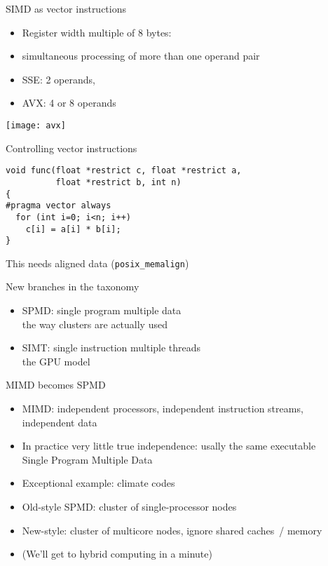 \begin{numberedframe}{SIMD as vector instructions}
  \begin{itemize}
  \item Register width multiple of 8 bytes:
  \item simultaneous processing of more than one operand pair
  \item SSE: 2 operands,
  \item AVX: 4 or 8 operands
  \end{itemize}
  \texttt{[image: avx]}
\end{numberedframe}

\begin{numberedframe}{Controlling vector instructions}
\begin{lstlisting}
void func(float *restrict c, float *restrict a,
          float *restrict b, int n)
{
#pragma vector always
  for (int i=0; i<n; i++)
    c[i] = a[i] * b[i];
}
\end{lstlisting}
This needs aligned data (\verb+posix_memalign+)
\end{numberedframe}

\begin{numberedframe}{New branches in the taxonomy}
  \begin{itemize}
  \item SPMD: single program multiple data\\
    the way clusters are actually used
  \item SIMT: single instruction multiple threads\\
    the GPU model
  \end{itemize}
\end{numberedframe}

\begin{numberedframe}{MIMD becomes SPMD}
  \begin{itemize}
  \item MIMD: independent processors, independent instruction streams, independent data
  \item In practice very little true independence: usally the same executable\\
    Single Program Multiple Data
  \item Exceptional example: climate codes
  \item Old-style SPMD: cluster of single-processor nodes
  \item New-style: cluster of multicore nodes, ignore shared caches~/ memory
  \item (We'll get to hybrid computing in a minute)
  \end{itemize}  
\end{numberedframe}

